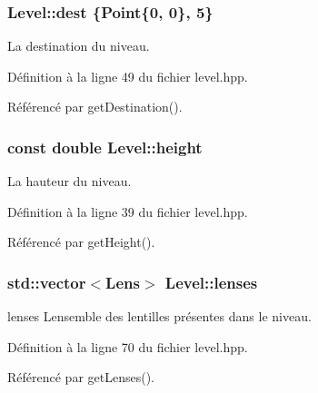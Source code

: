 \subsubsection[{dest}]{ Level\+::dest \{{\bf Point}\{0, 0\}, 5\}\hspace{0.3cm}{\ttfamily [private]}}\label{classLevel_adf6fd04f684283f895ad23a4d730b680}


La destination du niveau. 



Définition à la ligne 49 du fichier level.\+hpp.



Référencé par get\+Destination().

\hypertarget{classLevel_a65034a4fcaebb97c0a640600d1681ae9}{}
\subsubsection[{height}]{\setlength{\rightskip}{0pt plus 5cm}const double Level\+::height\hspace{0.3cm}{\ttfamily [private]}}\label{classLevel_a65034a4fcaebb97c0a640600d1681ae9}


La hauteur du niveau. 



Définition à la ligne 39 du fichier level.\+hpp.



Référencé par get\+Height().

\hypertarget{classLevel_aaeb7900ce3b81586203e8746a47ab3e2}{}
\subsubsection[{lenses}]{\setlength{\rightskip}{0pt plus 5cm}std\+::vector$<${\bf Lens}$>$ Level\+::lenses\hspace{0.3cm}{\ttfamily [private]}}\label{classLevel_aaeb7900ce3b81586203e8746a47ab3e2}


lenses L\textquotesingle{}ensemble des lentilles présentes dans le niveau. 



Définition à la ligne 70 du fichier level.\+hpp.



Référencé par get\+Lenses().

\hypertarget{classLevel_acdc507d55f78548739af4988d2af3647}{}
